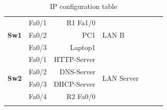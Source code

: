 \documentclass[11pt,a4paper]{report}
\begin{document}
\begin{longtable}[c]{llrllrr}
            \multirow{3}{*}{\textbf{Sw1}}                      & Fa0/1                        & R1 Fa1/0                  & \multirow{3}{*}{LAN B}                                & \multicolumn{3}{c}{\multirow{3}{*}{}}                                                                                                                                \\
                                                               & Fa0/2                        & PC1                       &                                                       & \multicolumn{3}{c}{}                                                                                                                                                 \\
                                                               & Fa0/3                        & Laptop1                   &                                                       & \multicolumn{3}{c}{}                                                                                                                                                 \\ \hline
            \multirow{4}{*}{\textbf{Sw2}}                      & Fa0/1                        & HTTP-Server               & \multirow{4}{*}{LAN Server}                           & \multicolumn{3}{c}{\multirow{4}{*}{}}                                                                                                                                \\
                                                               & Fa0/2                        & DNS-Server                &                                                       & \multicolumn{3}{c}{}                                                                                                                                                 \\
                                                               & Fa0/3                        & DHCP-Server               &                                                       & \multicolumn{3}{c}{}                                                                                                                                                 \\
                                                               & Fa0/4                        & R2 Fa0/0                  &                                                       & \multicolumn{3}{c}{}                                                                                                                                                 \\ \hline
            \caption{IP configuration table}
            \label{tab:ipconftable}\\
        \end{longtable}
\end{document}
